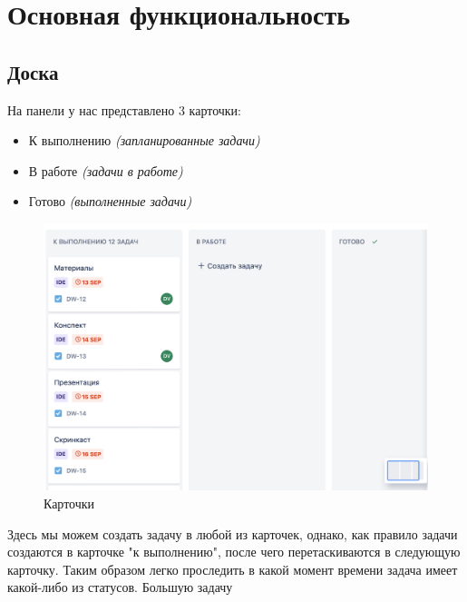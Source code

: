 \documentclass[12pt, a4paper]{article}
\begin{document}
    
    \newpage
    \section{Основная функциональность}
    \subsection{Доска}
    На панели у нас представлено 3 карточки:
    \begin{itemize}
        \item К выполнению \textit{(запланированные задачи)}
        \item В работе \textit{(задачи в работе)}
        \item Готово \textit{(выполненные задачи)}
    \end{itemize}
    \begin{figure}[H]
        \centering
        \includegraphics[width=0.75\linewidth]{src/desk.png}
        \caption{Карточки}
    \end{figure}
    Здесь мы можем создать задачу в любой из карточек, однако, как правило задачи создаются в карточке "к выполнению", 
    после чего перетаскиваются в следующую карточку.
    Таким образом легко проследить в какой момент времени задача имеет какой-либо из статусов.
    Большую задачу

    \newpage
\end{document}
